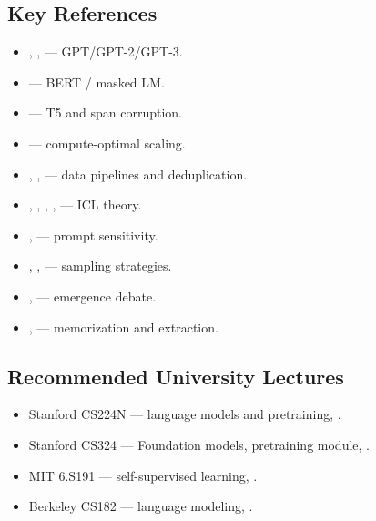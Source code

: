 \subsection{Key References}

\begin{itemize}
  \item \citet{radford2018improving}, \citet{radford2019language},
        \citet{brown2020language} --- GPT/GPT-2/GPT-3.
  \item \citet{devlin2019bert} --- BERT / masked LM.
  \item \citet{raffel2020t5} --- T5 and span corruption.
  \item \citet{hoffmann2022chinchilla} --- compute-optimal scaling.
  \item \citet{gao2020pile}, \citet{redpajama2023},
        \citet{lee2022deduplicating} --- data pipelines and
        deduplication.
  \item \citet{xie2022explanation}, \citet{olsson2022induction},
        \citet{garg2022transformers}, \citet{vonoswald2023transformers},
        \citet{dong2023survey} --- ICL theory.
  \item \citet{lu2022fantastically}, \citet{min2022rethinking} ---
        prompt sensitivity.
  \item \citet{holtzman2020curious}, \citet{fan2018hierarchical},
        \citet{nguyen2024minp} --- sampling strategies.
  \item \citet{wei2022emergent}, \citet{schaeffer2023mirage} ---
        emergence debate.
  \item \citet{carlini2021extracting}, \citet{carlini2023quantifying}
        --- memorization and extraction.
\end{itemize}

\subsection{Recommended University Lectures}

\begin{itemize}
  \item Stanford CS224N --- language models and pretraining,
        \citet{stanford_cs224n}.
  \item Stanford CS324 --- Foundation models, pretraining module,
        \citet{stanford_cs324}.
  \item MIT 6.S191 --- self-supervised learning, \citet{mit_6s191}.
  \item Berkeley CS182 --- language modeling, \citet{berkeley_cs182}.
\end{itemize}

